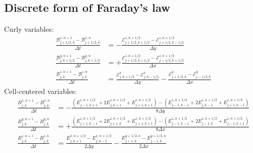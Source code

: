 \documentclass{article}
\begin{document}
\subsection{Discrete form of Faraday's law}
Curly variables:
\begin{align}
  \frac{\mathcal{B}^{x,n+1}_{j+1/2,k}
      - \mathcal{B}^{x,n  }_{j+1/2,k}}{\Delta t} &= -
  \frac{\mathcal{E}^{z,n+1/2}_{j+1/2,k+1/2}
      - \mathcal{E}^{z,n+1/2}_{j+1/2,k-1/2}}{\Delta y} \\
  \frac{\mathcal{B}^{y,n+1}_{j,k+1/2}
      - \mathcal{B}^{y,n  }_{j,k+1/2}}{\Delta t} &= +
  \frac{\mathcal{E}^{z,n+1/2}_{j+1/2,k+1/2}
      - \mathcal{E}^{z,n+1/2}_{j-1/2,k+1/2}}{\Delta x} \\
  \frac{\mathcal{B}^{z,n+1}_{j,k}
      - \mathcal{B}^{z,n  }_{j,k}}{\Delta t} &=
  \frac{\mathcal{E}^x_{j,k+1/2} - \mathcal{E}^x_{j,k-1/2}}{\Delta y} -
  \frac{\mathcal{E}^y_{j+1/2,k} - \mathcal{E}^y_{j-1/2,k}}{\Delta x}
\end{align}
Cell-centered variables:
\begin{align}
  \frac{B^{x,n+1}_{j,k} - B^{x,n}_{j,k}}{\Delta t} &=
  -\frac{
    (E^{z,n+1/2}_{j-1,k+1} + 2 E^{z,n+1/2}_{j,k+1} + E^{z,n+1/2}_{j+1,k+1}) -
    (E^{z,n+1/2}_{j-1,k-1} + 2 E^{z,n+1/2}_{j,k-1} + E^{z,n+1/2}_{j+1,k-1})}
    {8\Delta y} \\
  \frac{B^{y,n+1}_{j,k} - B^{y,n}_{j,k}}{\Delta t} &=
  +\frac{
    (E^{z,n+1/2}_{j+1,k-1} + 2 E^{z,n+1/2}_{j+1,k} + E^{z,n+1/2}_{j+1,k+1}) -
    (E^{z,n+1/2}_{j-1,k-1} + 2 E^{z,n+1/2}_{j-1,k} + E^{z,n+1/2}_{j-1,k+1})}
    {8\Delta x} \\
  \frac{B^{z,n+1}_{j,k} - B^{z,n}_{j,k}}{\Delta t} &=
  \frac{E^{x,n+1/2}_{j,k+1} - E^{x,n+1/2}_{j,k-1}}{2\Delta y} -
  \frac{E^{y+1/2,n}_{j+1,k} - E^{y+1/2,n}_{j-1,k}}{2\Delta x}
\end{align}
\end{document}
